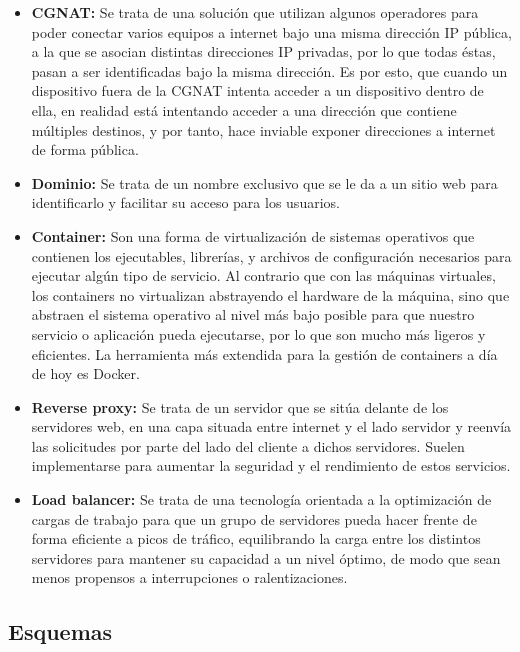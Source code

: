 \documentclass{article}
\begin{document}
\begin{itemize}
	\item \textbf{CGNAT:} Se trata de una solución que utilizan algunos operadores para poder conectar varios equipos a internet bajo una misma dirección IP pública, a la que se asocian distintas direcciones IP privadas, por lo que todas éstas, pasan a ser identificadas bajo la misma dirección. Es por esto, que cuando un dispositivo fuera de la CGNAT intenta acceder a un dispositivo dentro de ella, en realidad está intentando acceder a una dirección que contiene múltiples destinos, y por tanto, hace inviable exponer direcciones a internet de forma pública.
	\item \textbf{Dominio:} Se trata de un nombre exclusivo que se le da a un sitio web para identificarlo y facilitar su acceso para los usuarios.
	\item \textbf{Container:} Son una forma de virtualización de sistemas operativos que contienen los ejecutables, librerías, y archivos de configuración necesarios para ejecutar algún tipo de servicio. Al contrario que con las máquinas virtuales, los containers no virtualizan abstrayendo el hardware de la máquina, sino que abstraen el sistema operativo al nivel más bajo posible para que nuestro servicio o aplicación pueda ejecutarse, por lo que son mucho más ligeros y eficientes. La herramienta más extendida para la gestión de containers a día de hoy es Docker.
	\item \textbf{Reverse proxy:} Se trata de un servidor que se sitúa delante de los servidores web, en una capa situada entre internet y el lado servidor y reenvía las solicitudes por parte del lado del cliente a dichos servidores. Suelen implementarse para aumentar la seguridad y el rendimiento de estos servicios.
	\item \textbf{Load balancer:} Se trata de una tecnología orientada a la optimización de cargas de trabajo para que un grupo de servidores pueda hacer frente de forma eficiente a picos de tráfico, equilibrando la carga entre los distintos servidores para mantener su capacidad a un nivel óptimo, de modo que sean menos propensos a interrupciones o ralentizaciones.
\end{itemize}

\newpage
\subsection{Esquemas}
\label{sec:uml}
\end{document}
